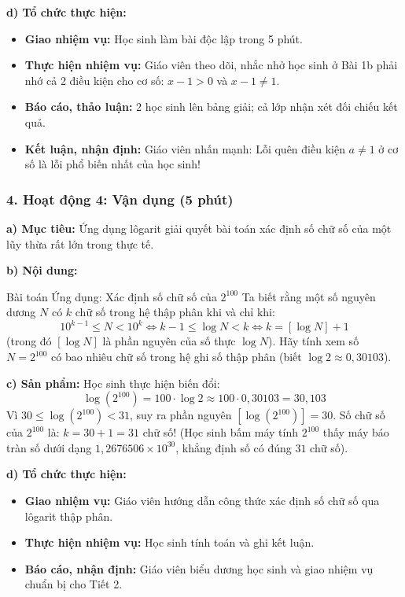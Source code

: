 \documentclass[12pt, a4paper]{article}
\begin{document}
\noindent \textbf{d) Tổ chức thực hiện:}
\begin{itemize}[leftmargin=0.6cm]
    \item \textbf{Giao nhiệm vụ:} Học sinh làm bài độc lập trong 5 phút.
    \item \textbf{Thực hiện nhiệm vụ:} Giáo viên theo dõi, nhắc nhở học sinh ở Bài 1b phải nhớ cả 2 điều kiện cho cơ số: $x - 1 > 0$ và $x - 1 \neq 1$.
    \item \textbf{Báo cáo, thảo luận:} 2 học sinh lên bảng giải; cả lớp nhận xét đối chiếu kết quả.
    \item \textbf{Kết luận, nhận định:} Giáo viên nhấn mạnh: Lỗi quên điều kiện $a \neq 1$ ở cơ số là lỗi phổ biến nhất của học sinh!
\end{itemize}

\subsubsection*{4. Hoạt động 4: Vận dụng (5 phút)}

\noindent \textbf{a) Mục tiêu:}
Ứng dụng lôgarit giải quyết bài toán xác định số chữ số của một lũy thừa rất lớn trong thực tế.

\noindent \textbf{b) Nội dung:}
\begin{pedabox}{Bài toán Ứng dụng: Xác định số chữ số của $2^{100}$}
Ta biết rằng một số nguyên dương $N$ có $k$ chữ số trong hệ thập phân khi và chỉ khi:
$$10^{k-1} \le N < 10^k \iff k - 1 \le \log N < k \iff k = [\log N] + 1$$
(trong đó $[\log N]$ là phần nguyên của số thực $\log N$).
Hãy tính xem số $N = 2^{100}$ có bao nhiêu chữ số trong hệ ghi số thập phân (biết $\log 2 \approx 0{,}30103$).
\end{pedabox}

\noindent \textbf{c) Sản phẩm:}
Học sinh thực hiện biến đổi:
$$\log(2^{100}) = 100 \cdot \log 2 \approx 100 \cdot 0{,}30103 = 30{,}103$$
Vì $30 \le \log(2^{100}) < 31$, suy ra phần nguyên $[\log(2^{100})] = 30$.
Số chữ số của $2^{100}$ là: $k = 30 + 1 = 31$ chữ số!
(Học sinh bấm máy tính $2^{100}$ thấy máy báo tràn số dưới dạng $1{,}2676506 \times 10^{30}$, khẳng định số có đúng $31$ chữ số).

\noindent \textbf{d) Tổ chức thực hiện:}
\begin{itemize}[leftmargin=0.6cm]
    \item \textbf{Giao nhiệm vụ:} Giáo viên hướng dẫn công thức xác định số chữ số qua lôgarit thập phân.
    \item \textbf{Thực hiện nhiệm vụ:} Học sinh tính toán và ghi kết luận.
    \item \textbf{Báo cáo, nhận định:} Giáo viên biểu dương học sinh và giao nhiệm vụ chuẩn bị cho Tiết 2.
\end{itemize}
\end{document}
